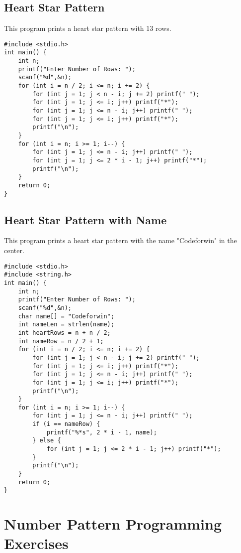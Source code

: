 \documentclass[a4paper,12pt]{article}
\begin{document}
\subsection{Heart Star Pattern}
This program prints a heart star pattern with 13 rows.
\begin{lstlisting}[caption={Heart Star Pattern}]
#include <stdio.h>
int main() {
    int n;
    printf("Enter Number of Rows: ");
    scanf("%d",&n);
    for (int i = n / 2; i <= n; i += 2) {
        for (int j = 1; j < n - i; j += 2) printf(" ");
        for (int j = 1; j <= i; j++) printf("*");
        for (int j = 1; j <= n - i; j++) printf(" ");
        for (int j = 1; j <= i; j++) printf("*");
        printf("\n");
    }
    for (int i = n; i >= 1; i--) {
        for (int j = 1; j <= n - i; j++) printf(" ");
        for (int j = 1; j <= 2 * i - 1; j++) printf("*");
        printf("\n");
    }
    return 0;
}
\end{lstlisting}
\clearpage

\subsection{Heart Star Pattern with Name}
This program prints a heart star pattern with the name "Codeforwin" in the center.
\begin{lstlisting}[caption={Heart Star Pattern with Name}]
#include <stdio.h>
#include <string.h>
int main() {
    int n;
    printf("Enter Number of Rows: ");
    scanf("%d",&n);
    char name[] = "Codeforwin";
    int nameLen = strlen(name);
    int heartRows = n + n / 2;
    int nameRow = n / 2 + 1;
    for (int i = n / 2; i <= n; i += 2) {
        for (int j = 1; j < n - i; j += 2) printf(" ");
        for (int j = 1; j <= i; j++) printf("*");
        for (int j = 1; j <= n - i; j++) printf(" ");
        for (int j = 1; j <= i; j++) printf("*");
        printf("\n");
    }
    for (int i = n; i >= 1; i--) {
        for (int j = 1; j <= n - i; j++) printf(" ");
        if (i == nameRow) {
            printf("%*s", 2 * i - 1, name);
        } else {
            for (int j = 1; j <= 2 * i - 1; j++) printf("*");
        }
        printf("\n");
    }
    return 0;
}
\end{lstlisting}
\clearpage

\section{Number Pattern Programming Exercises}
\end{document}
